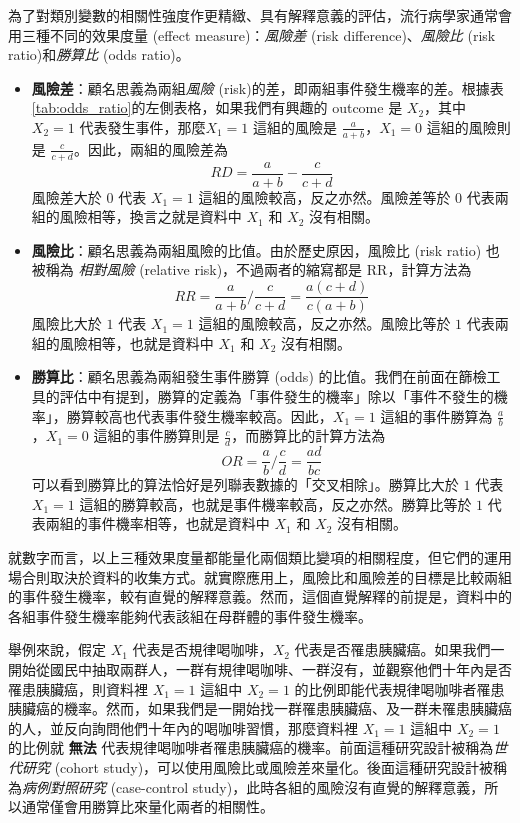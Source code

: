     為了對類別變數的相關性強度作更精緻、具有解釋意義的評估，流行病學家通常會用三種不同的效果度量 (effect measure)：\textit{風險差} (risk difference)、\textit{風險比} (risk ratio)和\textit{勝算比} (odds ratio)。
    \begin{itemize}
        \item \textbf{風險差}：顧名思義為兩組\textit{風險} (risk)的差，即兩組事件發生機率的差。根據表\ref{tab:odds_ratio}的左側表格，如果我們有興趣的 outcome 是 $X_2$，其中 $X_2 = 1$ 代表發生事件，那麼$X_1 = 1$ 這組的風險是 $\frac{a}{a+b}$，$X_1 = 0$ 這組的風險則是 $\frac{c}{c+d}$。因此，兩組的風險差為 
        \smallskip
        \[RD = \frac{a}{a+b}-\frac{c}{c+d}\]
        \smallskip
        風險差大於 $0$ 代表 $X_1 = 1$ 這組的風險較高，反之亦然。風險差等於 $0$ 代表兩組的風險相等，換言之就是資料中 $X_1$ 和 $X_2$ 沒有相關。
        \item \textbf{風險比}：顧名思義為兩組風險的比值。由於歷史原因，風險比 (risk ratio) 也被稱為 \textit{相對風險} (relative risk)，不過兩者的縮寫都是 RR，計算方法為
        \smallskip
        \[RR = \frac{a}{a+b}\Big/\frac{c}{c+d} = \frac{a(c+d)}{c(a+b)}\]
        \smallskip
        風險比大於 $1$ 代表 $X_1 = 1$ 這組的風險較高，反之亦然。風險比等於 $1$ 代表兩組的風險相等，也就是資料中 $X_1$ 和 $X_2$ 沒有相關。
        \item \textbf{勝算比}：顧名思義為兩組發生事件勝算 (odds) 的比值。我們在前面在篩檢工具的評估中有提到，勝算的定義為「事件發生的機率」除以「事件不發生的機率」，勝算較高也代表事件發生機率較高。因此，$X_1 = 1$ 這組的事件勝算為 $\frac{a}{b}$，$X_1 = 0$ 這組的事件勝算則是 $\frac{c}{d}$，而勝算比的計算方法為
        \smallskip
        \[OR = \frac{a}{b}\Big/\frac{c}{d} = \frac{ad}{bc}\]
        \smallskip
        可以看到勝算比的算法恰好是列聯表數據的「交叉相除」。勝算比大於 $1$ 代表 $X_1 = 1$ 這組的勝算較高，也就是事件機率較高，反之亦然。勝算比等於 $1$ 代表兩組的事件機率相等，也就是資料中 $X_1$ 和 $X_2$ 沒有相關。
    \end{itemize}
    就數字而言，以上三種效果度量都能量化兩個類比變項的相關程度，但它們的運用場合則取決於資料的收集方式。就實際應用上，風險比和風險差的目標是比較兩組的事件發生機率，較有直覺的解釋意義。然而，這個直覺解釋的前提是，資料中的各組事件發生機率能夠代表該組在母群體的事件發生機率。

    \medskip
    
    舉例來說，假定 $X_1$ 代表是否規律喝咖啡，$X_2$ 代表是否罹患胰臟癌。如果我們一開始從國民中抽取兩群人，一群有規律喝咖啡、一群沒有，並觀察他們十年內是否罹患胰臟癌，則資料裡 $X_1 = 1$ 這組中 $X_2 = 1$ 的比例即能代表規律喝咖啡者罹患胰臟癌的機率。然而，如果我們是一開始找一群罹患胰臟癌、及一群未罹患胰臟癌的人，並反向詢問他們十年內的喝咖啡習慣，那麼資料裡 $X_1 = 1$ 這組中 $X_2 = 1$ 的比例就 \textbf{無法} 代表規律喝咖啡者罹患胰臟癌的機率。前面這種研究設計被稱為\textit{世代研究} (cohort study)，可以使用風險比或風險差來量化。後面這種研究設計被稱為\textit{病例對照研究} (case-control study)，此時各組的風險沒有直覺的解釋意義，所以通常僅會用勝算比來量化兩者的相關性。

